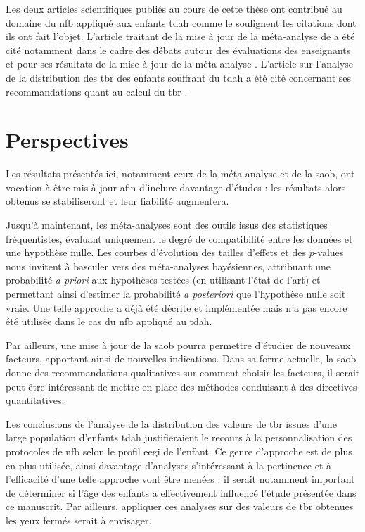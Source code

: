 Les deux articles scientifiques publiés au cours de cette thèse ont contribué au domaine du \gls{nfb} appliqué aux enfants \gls{tdah}
comme le soulignent les citations dont ils ont fait l'objet. L'article traitant de la mise à jour de la méta-analyse de \citet{Cortese2016} 
\citep{Bussalb2019clinical} a été cité notamment dans le cadre des débats autour des évaluations des enseignants \citep{Bottinger2020} et pour ses résultats
de la mise à jour de la méta-analyse \citep{Bluschke2020}. L'article sur l'analyse de la distribution des \gls{tbr} des enfants souffrant du \gls{tdah} 
\citep{Bussalb2019clinical}
a été cité concernant ses recommandations quant au calcul du \gls{tbr} \citep{Bioulac2020}. 

\section{Perspectives}

Les résultats présentés ici, notamment ceux de la méta-analyse et de la \gls{saob}, ont vocation à être mis à jour afin d'inclure davantage 
d'études : les résultats alors obtenus se stabiliseront et leur fiabilité augmentera.   

Jusqu'à maintenant, les méta-analyses sont des outils issus des statistiques fréquentistes,
évaluant uniquement le degré de compatibilité entre les données et une hypothèse nulle.
Les courbes d'évolution des tailles d'effets et des $p$-values nous invitent à basculer vers des méta-analyses bayésiennes,
attribuant une probabilité \textit{a priori} aux hypothèses testées (en utilisant l'état de l'art) et permettant ainsi d'estimer 
la probabilité \textit{a posteriori} que l'hypothèse nulle soit vraie.
Une telle approche a déjà été décrite et implémentée \citep{Dormuth2016, Spiegelhalter2004} mais n'a pas encore été 
utilisée dans le cas du \gls{nfb} appliqué au \gls{tdah}.  

Par ailleurs, une mise à jour de la \gls{saob} pourra permettre d'étudier de nouveaux facteurs, apportant ainsi de nouvelles  
indications. Dans sa forme actuelle, la \gls{saob} donne des recommandations qualitatives sur comment choisir les facteurs, 
il serait peut-être intéressant de mettre en place des méthodes conduisant à des directives quantitatives.

Les conclusions de l'analyse de la distribution des valeurs de \gls{tbr} issues d'une large population d'enfants \gls{tdah} justifieraient le recours à la 
personnalisation des protocoles de \gls{nfb} selon le profil \gls{eegi} de l'enfant. Ce genre d'approche est de plus en plus utilisée, ainsi davantage 
d'analyses s'intéressant
à la pertinence et à l'efficacité d'une telle approche vont être menées : il serait notamment important de déterminer si l'âge des enfants 
a effectivement influencé l'étude
présentée dans ce manuscrit. Par ailleurs, appliquer ces analyses sur des valeurs de \gls{tbr} obtenues les yeux fermés serait à envisager. 

